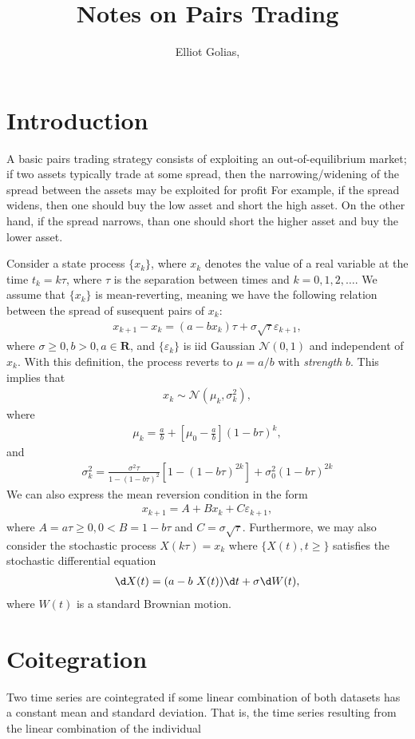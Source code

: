 \documentclass[a4paper,11pt]{article}
\title{\boldmath Notes on Pairs Trading}
\author{Elliot Golias,\note{Corresponding author.}}
\affiliation[a]{Case Western Reserve University,\\some-street, Country}
\begin{document}
 
\maketitle
\flushbottom

\section{Introduction}
\label{sec:intro}

A basic pairs trading strategy consists of exploiting an out-of-equilibrium market; if two assets typically trade at some spread, then the narrowing/widening of the spread between the assets may be exploited for profit
For example, if the spread widens, then one should buy the low asset and short the high asset. On the other hand, if the spread narrows, than one should short the higher asset and buy the lower asset. 

Consider a state process $\{x_k\}$, where $x_k$ denotes the value of a real variable at the time $t_k = k \tau$, where $\tau$ is the separation between times and $k=0, 1, 2, \dots$. We assume that $\{ x_k \}$ is mean-reverting, meaning we have the following relation between the spread of susequent pairs of $x_k$:
%
\begin{align}
	x_{k+1} - x_k = (a-b x_k) \tau + \sigma \sqrt{\tau} \varepsilon_{k+1},
\end{align}
%
where $\sigma \geq 0, b > 0, a \in \mathbf{R}$, and $\{ \varepsilon_k \}$ is iid Gaussian $\mathcal{N}(0, 1)$ and independent of ${x_k}$. With this definition, the process reverts to $\mu = a/b$ with \textit{strength} $b$. This implies that
%
\begin{align}
	x_k \sim \mathcal{N}(\mu_k, \sigma_k^2),
\end{align}
%
where
%
\begin{align}
	\mu_k = \frac{a}{b} +\left[\mu_0 - \frac{a}{b} \right](1 - b \tau)^k,
\end{align}
%
and
%
\begin{align}
	\sigma_k^2 = \frac{\sigma^2 \tau}{1-(1-b \tau)^2} \left [ 1-(1-b\tau)^{2k} \right] + \sigma_0^2 (1-b \tau)^{2k}
\end{align}
%
We can also express the mean reversion condition in the form
%
\begin{align}
	x_{k+1} = A + B x_k + C \varepsilon_{k+1},
\end{align}
%
where $A = a \tau \geq 0, 0 < B = 1- b \tau$ and $C = \sigma \sqrt{\tau}$.
%
Furthermore, we may also consider the stochastic process $X(k\tau) = x_k$ where $\{X(t), t \geq \}$ satisfies the stochastic differential equation
%
\begin{align}
	\d X(t) = (a - b \ X(t)) \d t + \sigma \d W(t),
\end{align}
%
where $W(t)$ is a standard Brownian motion.

\section{Coitegration}
%
Two time series are cointegrated if some linear combination of both datasets has a constant mean and standard deviation. That is, the time series resulting from the linear combination of the individual
\end{document}
